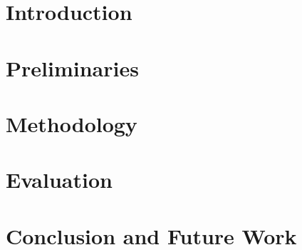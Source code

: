 \documentclass[headsepline,footsepline,footinclude=false,oneside,fontsize=11pt,paper=a4,listof=totoc,bibliography=totoc]{scrbook} %
\begin{document}


\frontmatter{}


% 

\tableofcontents{}

\mainmatter{}
\chapter{Introduction}





\chapter{Preliminaries}


\chapter{Methodology}




\chapter{Evaluation}





\chapter{Conclusion and Future Work}


% 
% 
% 
% 
% 

\appendix{}
\listoffigures{}
\listoftables{}
\printbibliography{}
\end{document}

